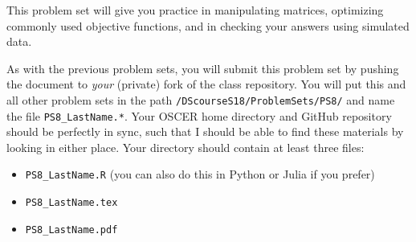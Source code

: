 \documentclass[12pt,english]{exam}
\begin{document}
This problem set will give you practice in manipulating matrices, optimizing commonly used objective functions, and in checking your answers using simulated data.

As with the previous problem sets, you will submit this problem set by pushing the document to \emph{your} (private) fork of the class repository. You will put this and all other problem sets in the path \texttt{/DScourseS18/ProblemSets/PS8/} and name the file \texttt{PS8\_LastName.*}. Your OSCER home directory and GitHub repository should be perfectly in sync, such that I should be able to find these materials by looking in either place. Your directory should contain at least three files:
\begin{itemize}
    \item \texttt{PS8\_LastName.R} (you can also do this in Python or Julia if you prefer)
    \item \texttt{PS8\_LastName.tex}
    \item \texttt{PS8\_LastName.pdf}
\end{itemize}
\end{document}
